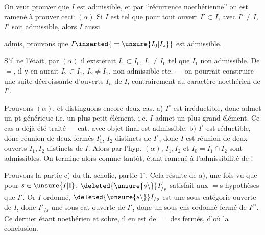 On veut prouver que $I$ est admissible, et par ``récurrence noethérienne'' on est ramené à prouver ceci: $(\alpha)$ Si $I$ est
\margin{$\Big|$}
tel que pour tout ouvert $I'\subset I$, avec $I'\ne I$,  $I'$ soit admissible, alors $I$ aussi.

  \inserted{$(\alpha)$} admis, prouvons que $I\inserted{{}=\unsure{I_0|I_\circ}}$ est admissible.

S'il ne l'était, par $(\alpha)$ il existerait $I_1\subset I_0$, $I_1\ne I_0$ tel que $I_1$ non admissible. De $=$, il y en aurait $I_2\subset I_1$, $I_2\ne I_1$, non admissible etc. --- on pourrait construire une suite  décroissante d'ouverts $I_n$ de $I$, contrairement au caractère noethérien de $I^\circ$.

Prouvons $(\alpha)$, et distinguons encore deux cas. a) $I^\circ$ est irréductible, donc admet un pt générique i.e. un plus petit élément, i.e. $I$ admet un plus grand élément. Ce cas a déjà été traité  ---   cat. avec objet final est admissible. b) $I^\circ$ est réductible, donc  réunion de deux fermés $I_1^\circ$, $I_2$ distincts de $I^\circ$, donc $I$ est réunion de deux ouverts $I_1,I_2$ distincts de $I$. Alors par l'hyp.  $(\alpha)$, $I_1,I_2$  et $I_0=I_1\cap I_2$ sont admissibles. On termine alors comme tantôt, étant ramené à l'admissibilité de
!

Prouvons la partie c) du th.-scholie, partie $1^\circ$. Cela résulte de a), une fois vu que pour $s\in\unsure{I|\mathbb{I}}$, $\deleted{\unsure{s\backslash}}I'_{/s}$ satisfait aux $=$s hypothèses que $I'$. Or $I$  ordonné, $\deleted{\unsure{s\backslash}}I_{/s}$ est une sous-catégorie ouverte de $I$, donc $I'_{/s}$ une sous-cat ouverte de $I'$, donc  un sous-ens ordonné fermé de $I'^\circ$. Ce dernier étant noethérien et sobre, il en est de $=$ des  fermés, d'où la conclusion.

